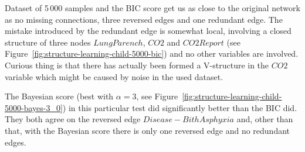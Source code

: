 \documentclass[english,cover]{fitthesis} %
\begin{document}
Dataset of 5\,000 samples and the BIC score get us as close to the original network as no missing connections, three reversed edges and one redundant edge. The mistake introduced by the redundant edge is somewhat local, involving a closed structure of three nodes $LungParench$, $CO2$ and $CO2Report$ (see Figure~\ref{fig:structure-learning-child-5000-bic}) and no other variables are involved. Curious thing is that there has actually been formed a V-structure in the $CO2$ variable which might be caused by noise in the used dataset.

The Bayesian score (best with $\alpha=3$, see Figure~\ref{fig:structure-learning-child-5000-bayes-3_0}) in this particular test did significantly better than the BIC did. They both agree on the reversed edge $Disease - BithAsphyxia$ and, other than that, with the Bayesian score there is only one reversed edge and no redundant edges.
\end{document}
